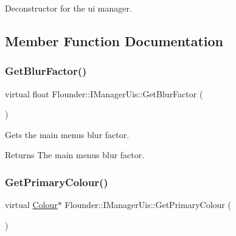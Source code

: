 Deconstructor for the ui manager. 



\subsection{Member Function Documentation}
\mbox{\label{class_flounder_1_1_i_manager_uis_a870d31e72e526f60da335b7db199439e}} 
\subsubsection{\texorpdfstring{Get\+Blur\+Factor()}{GetBlurFactor()}}
{\footnotesize\ttfamily virtual float Flounder\+::\+I\+Manager\+Uis\+::\+Get\+Blur\+Factor (\begin{DoxyParamCaption}{ }\end{DoxyParamCaption})\hspace{0.3cm}{\ttfamily [pure virtual]}}



Gets the main menu\textquotesingle{}s blur factor. 

\begin{DoxyReturn}{Returns}
The main menu\textquotesingle{}s blur factor. 
\end{DoxyReturn}
\mbox{\label{class_flounder_1_1_i_manager_uis_ad9337b92e6eb3910e111b89f3c3bb2e1}} 
\subsubsection{\texorpdfstring{Get\+Primary\+Colour()}{GetPrimaryColour()}}
{\footnotesize\ttfamily virtual \hyperlink{class_flounder_1_1_colour}{Colour}$\ast$ Flounder\+::\+I\+Manager\+Uis\+::\+Get\+Primary\+Colour (\begin{DoxyParamCaption}{ }\end{DoxyParamCaption})\hspace{0.3cm}{\ttfamily [pure virtual]}}




